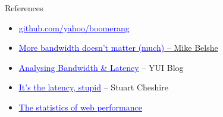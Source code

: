 \documentclass{beamer}
\begin{document}
\begin{frame}{References}
  \begin{itemize}
  \item \href{http://github.com/yahoo/boomerang/}{\textcolor{blue}{\underline{github.com/yahoo/boomerang}}}
  \item \href{http://www.belshe.com/2010/05/24/more-bandwidth-doesnt-matter-much/}{\textcolor{blue}{\underline{More bandwidth doesn't matter (much)}} -- Mike Belshe}
  \item \href{http://www.yuiblog.com/blog/2010/04/08/analyzing-bandwidth-and-latency/}{\textcolor{blue}{\underline{Analysing Bandwidth \& Latency}}} -- YUI Blog
  \item \href{http://www.stuartcheshire.org/rants/Latency.html}{\textcolor{blue}{\underline{It's the latency, stupid}}} -- Stuart Cheshire
  \item \href{http://www.slideshare.net/bluesmoon/index-3441823}{\textcolor{blue}{\underline{The statistics of web performance}}}
  \end{itemize}
\end{frame}
\end{document}
